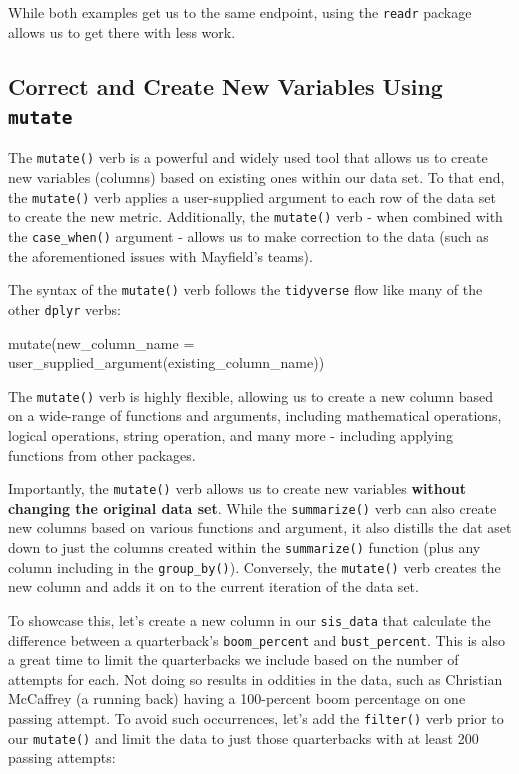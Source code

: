 \documentclass[
  letterpaper,
]{krantz}
\newenvironment{Shaded}{\begin{snugshade}}{\end{snugshade}}
\newcommand{\AttributeTok}[1]{\textcolor[rgb]{0.40,0.45,0.13}{#1}}
\newcommand{\FunctionTok}[1]{\textcolor[rgb]{0.28,0.35,0.67}{#1}}
\newcommand{\NormalTok}[1]{\textcolor[rgb]{0.00,0.23,0.31}{#1}}
\begin{document}
While both examples get us to the same endpoint, using the
\texttt{readr} package allows us to get there with less work.

\hypertarget{correct-and-create-new-variables-using-mutate}{%
\subsection{\texorpdfstring{Correct and Create New Variables Using
\texttt{mutate}}{Correct and Create New Variables Using mutate}}\label{correct-and-create-new-variables-using-mutate}}

The \texttt{mutate()} verb is a powerful and widely used tool that
allows us to create new variables (columns) based on existing ones
within our data set. To that end, the \texttt{mutate()} verb applies a
user-supplied argument to each row of the data set to create the new
metric. Additionally, the \texttt{mutate()} verb - when combined with
the \texttt{case\_when()} argument - allows us to make correction to the
data (such as the aforementioned issues with Mayfield's teams).

The syntax of the \texttt{mutate()} verb follows the \texttt{tidyverse}
flow like many of the other \texttt{dplyr} verbs:

\begin{Shaded}
\begin{Highlighting}[]
\FunctionTok{mutate}\NormalTok{(}\AttributeTok{new\_column\_name =} \FunctionTok{user\_supplied\_argument}\NormalTok{(existing\_column\_name))}
\end{Highlighting}
\end{Shaded}

The \texttt{mutate()} verb is highly flexible, allowing us to create a
new column based on a wide-range of functions and arguments, including
mathematical operations, logical operations, string operation, and many
more - including applying functions from other packages.

Importantly, the \texttt{mutate()} verb allows us to create new
variables \textbf{without changing the original data set}. While the
\texttt{summarize()} verb can also create new columns based on various
functions and argument, it also distills the dat aset down to just the
columns created within the \texttt{summarize()} function (plus any
column including in the \texttt{group\_by()}). Conversely, the
\texttt{mutate()} verb creates the new column and adds it on to the
current iteration of the data set.

To showcase this, let's create a new column in our \texttt{sis\_data}
that calculate the difference between a quarterback's
\texttt{boom\_percent} and \texttt{bust\_percent}. This is also a great
time to limit the quarterbacks we include based on the number of
attempts for each. Not doing so results in oddities in the data, such as
Christian McCaffrey (a running back) having a 100-percent boom
percentage on one passing attempt. To avoid such occurrences, let's add
the \texttt{filter()} verb prior to our \texttt{mutate()} and limit the
data to just those quarterbacks with at least 200 passing attempts:
\end{document}
